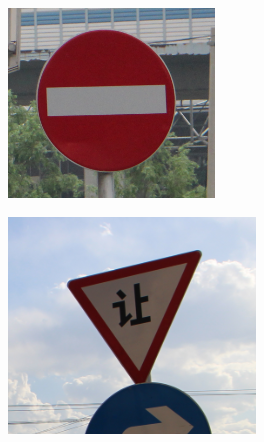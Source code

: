 \begin{figure}[H]
\begin{subfigure}[b]{0.125\textwidth}
        \caption{}
    \end{subfigure}
    \hspace{3em}%
    \begin{subfigure}[b]{0.125\textwidth}
        \centering
        \includegraphics[height=\textwidth]{../images/3 Konzeption des Generative Adversarial Networks/Chinese Dataset/055_1_0029.png}
        \caption{}
    \end{subfigure}
    \hspace{3em}%
    \begin{subfigure}[b]{0.125\textwidth}
     \centering
     \includegraphics[height=\textwidth]{../images/3 Konzeption des Generative Adversarial Networks/Chinese Dataset/056_1_0015.png}

\end{subfigure}
\end{figure}
